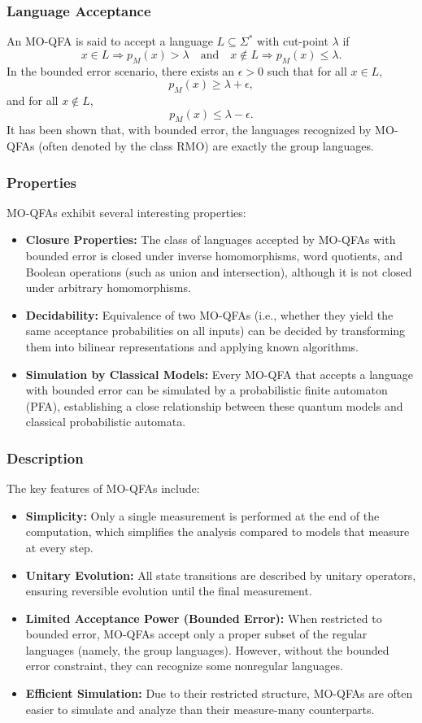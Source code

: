 \subsubsection{Language Acceptance}
An MO-QFA is said to accept a language $L\subseteq\Sigma^*$ with cut-point $\lambda$ if
\[
x\in L \Longrightarrow p_M(x) > \lambda \quad \text{and} \quad x\notin L \Longrightarrow p_M(x) \le \lambda.
\]
In the bounded error scenario, there exists an $\epsilon>0$ such that for all $x\in L$, 
\[
p_M(x) \ge \lambda + \epsilon,
\]
and for all $x\notin L$,
\[
p_M(x) \le \lambda - \epsilon.
\]
It has been shown that, with bounded error, the languages recognized by MO-QFAs (often denoted by the class RMO) are exactly the group languages.

\subsubsection{Properties}
MO-QFAs exhibit several interesting properties:
\begin{itemize}
  \item \textbf{Closure Properties:} The class of languages accepted by MO-QFAs with bounded error is closed under inverse homomorphisms, word quotients, and Boolean operations (such as union and intersection), although it is not closed under arbitrary homomorphisms.
  \item \textbf{Decidability:} Equivalence of two MO-QFAs (i.e., whether they yield the same acceptance probabilities on all inputs) can be decided by transforming them into bilinear representations and applying known algorithms.
  \item \textbf{Simulation by Classical Models:} Every MO-QFA that accepts a language with bounded error can be simulated by a probabilistic finite automaton (PFA), establishing a close relationship between these quantum models and classical probabilistic automata.
\end{itemize}

\subsubsection{Description}
The key features of MO-QFAs include:
\begin{itemize}
  \item \textbf{Simplicity:} Only a single measurement is performed at the end of the computation, which simplifies the analysis compared to models that measure at every step.
  \item \textbf{Unitary Evolution:} All state transitions are described by unitary operators, ensuring reversible evolution until the final measurement.
  \item \textbf{Limited Acceptance Power (Bounded Error):} When restricted to bounded error, MO-QFAs accept only a proper subset of the regular languages (namely, the group languages). However, without the bounded error constraint, they can recognize some nonregular languages.
  \item \textbf{Efficient Simulation:} Due to their restricted structure, MO-QFAs are often easier to simulate and analyze than their measure-many counterparts.
\end{itemize}

